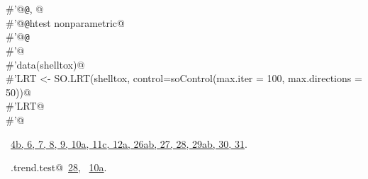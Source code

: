 \documentclass[reqno]{amsart}
\renewcommand{\NWlink}[2]{\hyperlink{#1}{#2}}
\begin{document}
\begin{flushleft}
\begin{list}{}{}
\mbox{}\verb@#'@{\tt @}\verb@seealso {}, @\\
\mbox{}\verb@#'@{\tt @}\verb@keywords htest nonparametric@\\
\mbox{}\verb@#'@{\tt @}\verb@examples@\\
\mbox{}\verb@#'@\\
\mbox{}\verb@#'data(shelltox)@\\
\mbox{}\verb@#'LRT <- SO.LRT(shelltox, control=soControl(max.iter = 100, max.directions = 50))@\\
\mbox{}\verb@#'LRT@\\
\mbox{}\verb@#'@\\
\mbox{}\verb@@{\NWsep}
\end{list}
\vspace{-1.5ex}
\footnotesize
\begin{list}{}{\setlength{\itemsep}{-\parsep}\setlength{\itemindent}{-\leftmargin}}
\item \NWtxtFileDefBy\ \NWlink{nuweb4b}{4b}\NWlink{nuweb6}{, 6}\NWlink{nuweb7}{, 7}\NWlink{nuweb8}{, 8}\NWlink{nuweb9}{, 9}\NWlink{nuweb10a}{, 10a}\NWlink{nuweb11c}{, 11c}\NWlink{nuweb12a}{, 12a}\NWlink{nuweb26a}{, 26a}\NWlink{nuweb26b}{b}\NWlink{nuweb27}{, 27}\NWlink{nuweb28}{, 28}\NWlink{nuweb29a}{, 29a}\NWlink{nuweb29b}{b}\NWlink{nuweb30}{, 30}\NWlink{nuweb31}{, 31}.
\item \NWtxtIdentsUsed\nobreak\  \verb@SO.trend.test@\nobreak\ \NWlink{nuweb28}{28}, \verb@soControl@\nobreak\ \NWlink{nuweb10a}{10a}.
\item{}
\end{list}
\vspace{4ex}
\end{flushleft}
\end{document}
